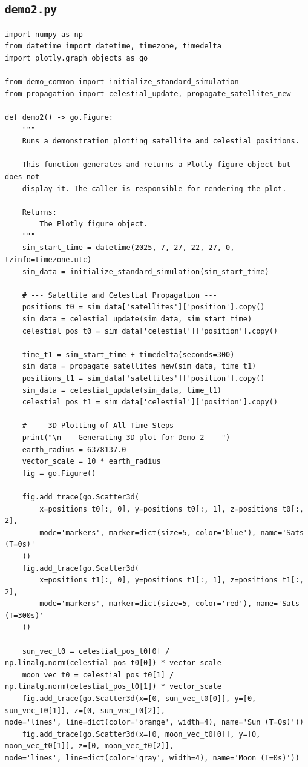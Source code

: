 \documentclass[11pt]{article}
\begin{document}
\subsection{\texttt{demo2.py}}
\begin{Verbatim}
import numpy as np
from datetime import datetime, timezone, timedelta
import plotly.graph_objects as go

from demo_common import initialize_standard_simulation
from propagation import celestial_update, propagate_satellites_new

def demo2() -> go.Figure:
    """
    Runs a demonstration plotting satellite and celestial positions.

    This function generates and returns a Plotly figure object but does not
    display it. The caller is responsible for rendering the plot.

    Returns:
        The Plotly figure object.
    """
    sim_start_time = datetime(2025, 7, 27, 22, 27, 0, tzinfo=timezone.utc)
    sim_data = initialize_standard_simulation(sim_start_time)

    # --- Satellite and Celestial Propagation ---
    positions_t0 = sim_data['satellites']['position'].copy()
    sim_data = celestial_update(sim_data, sim_start_time)
    celestial_pos_t0 = sim_data['celestial']['position'].copy()

    time_t1 = sim_start_time + timedelta(seconds=300)
    sim_data = propagate_satellites_new(sim_data, time_t1)
    positions_t1 = sim_data['satellites']['position'].copy()
    sim_data = celestial_update(sim_data, time_t1)
    celestial_pos_t1 = sim_data['celestial']['position'].copy()

    # --- 3D Plotting of All Time Steps ---
    print("\n--- Generating 3D plot for Demo 2 ---")
    earth_radius = 6378137.0
    vector_scale = 10 * earth_radius
    fig = go.Figure()

    fig.add_trace(go.Scatter3d(
        x=positions_t0[:, 0], y=positions_t0[:, 1], z=positions_t0[:, 2],
        mode='markers', marker=dict(size=5, color='blue'), name='Sats (T=0s)'
    ))
    fig.add_trace(go.Scatter3d(
        x=positions_t1[:, 0], y=positions_t1[:, 1], z=positions_t1[:, 2],
        mode='markers', marker=dict(size=5, color='red'), name='Sats (T=300s)'
    ))

    sun_vec_t0 = celestial_pos_t0[0] / np.linalg.norm(celestial_pos_t0[0]) * vector_scale
    moon_vec_t0 = celestial_pos_t0[1] / np.linalg.norm(celestial_pos_t0[1]) * vector_scale
    fig.add_trace(go.Scatter3d(x=[0, sun_vec_t0[0]], y=[0, sun_vec_t0[1]], z=[0, sun_vec_t0[2]],
mode='lines', line=dict(color='orange', width=4), name='Sun (T=0s)'))
    fig.add_trace(go.Scatter3d(x=[0, moon_vec_t0[0]], y=[0, moon_vec_t0[1]], z=[0, moon_vec_t0[2]],
mode='lines', line=dict(color='gray', width=4), name='Moon (T=0s)'))


\end{Verbatim}
\end{document}
